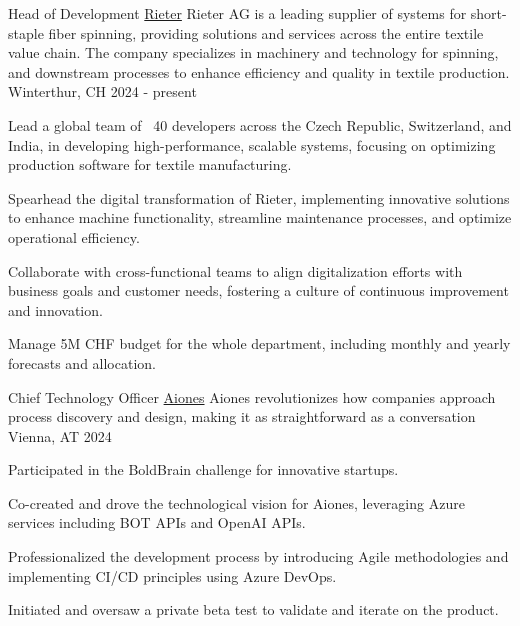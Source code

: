 
\begin{cventries}
  \cventry
    {Head of Development} %
    {\href{https://www.rieter.com}{Rieter}} %
    {Rieter AG is a leading supplier of systems for short-staple fiber spinning, providing solutions and services across the entire textile value chain. The company specializes in machinery and technology for spinning, and downstream processes to enhance efficiency and quality in textile production.} %
    {Winterthur, CH} %
    {2024 - present} %
    {
        \begin{cvitems}
            \item {Lead a global team of ~40 developers across the Czech Republic, Switzerland, and India, in developing high-performance, scalable systems, focusing on optimizing production software for textile manufacturing.}
            \item {Spearhead the digital transformation of Rieter, implementing innovative solutions to enhance machine functionality, streamline maintenance processes, and optimize operational efficiency.}
            \item {Collaborate with cross-functional teams to align digitalization efforts with business goals and customer needs, fostering a culture of continuous improvement and innovation.}
            \item {Manage 5M CHF budget for the whole department, including monthly and yearly forecasts and allocation.}
        \end{cvitems}
    }
  \cventry
  {Chief Technology Officer} %
  {\href{https://www.aiones.ai}{Aiones}} %
  {Aiones revolutionizes how companies approach process discovery and design, making it as straightforward as a conversation} %
  {Vienna, AT} %
  {2024} %
  {
    \begin{cvitems} %
      \item {Participated in the BoldBrain challenge for innovative startups.}
      \item {Co-created and drove the technological vision for Aiones, leveraging Azure services including BOT APIs and OpenAI APIs.}
      \item {Professionalized the development process by introducing Agile methodologies and implementing CI/CD principles using Azure DevOps.}
      \item {Initiated and oversaw a private beta test to validate and iterate on the product.}

\end{cvitems}}
\end{cventries}
